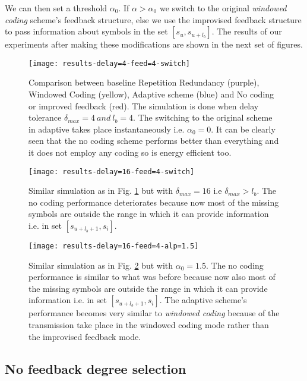 We can then set a threshold $\alpha_0$. If $\alpha > \alpha_0$ we switch to the original \textit{windowed coding} scheme's feedback structure, else we use the improvised feedback structure to pass information about symbols in the set $[s_{u}, s_{u+l_b}]$. The results of our experiments after making these modifications are shown in the next set of figures.

	
\begin{figure}
	\centering
	\texttt{[image: results-delay=4-feed=4-switch]}
	\caption{Comparison between baseline Repetition Redundancy (purple), Windowed Coding (yellow), Adaptive scheme (blue) and No coding or improved feedback (red). The simulation is done when delay tolerance $\delta_{max}=4\ and\ l_b=4$. The switching to the original scheme in adaptive takes place instantaneously i.e. $\alpha_0 = 0$. It can be clearly seen that the no coding scheme performs better than everything and it does not employ any coding so is energy efficient too.}
	\label{results-feed-1}
\end{figure}

\begin{figure}
	\centering
	\texttt{[image: results-delay=16-feed=4-switch]}
	\caption{Similar simulation as in Fig. \ref{results-feed-1} but with $\delta_{max}=16$ i.e $\delta_{max} > l_b$. The no coding performance deteriorates because now most of the missing symbols are outside the range in which it can provide information i.e. in set $[s_{u+l_b+1}, s_i]$.}
	\label{results-feed-2}
\end{figure}

\begin{figure}[t]
	\centering
	\texttt{[image: results-delay=16-feed=4-alp=1.5]}
	\caption{Similar simulation as in Fig. \ref{results-feed-2} but with $\alpha_0 = 1.5$. The no coding performance is similar to what was before because now also most of the missing symbols are outside the range in which it can provide information i.e. in set $[s_{u+l_b+1}, s_i]$. The adaptive scheme's performance becomes very similar to \textit{windowed coding} because of the transmission take place in the windowed coding mode rather than the improvised feedback mode.\\}
	\label{results-feed-3}
\end{figure}


\subsection{No feedback degree selection}

